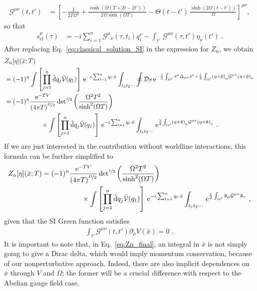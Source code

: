 \documentclass[12pt,a4paper]{article}
\numberwithin{equation}{section}
\numberwithin{equation}{section}
\begin{document}
\begin{align}
\mathcal{G}^{\mu\nu} (t,t')
&= \left[-\frac{1}{2T\Omega^2}+ \frac{\cosh{(\Omega(T+2t-2t'))}}{2\Omega\sinh{(\Omega T)}}- \Theta(t-t') \, \frac{\sinh{(2\Omega(t-t'))}}{\Omega} \right]^{\mu\nu}\!\! ,
\end{align}
so that
\begin{align}
s^\mu_{\mathrm{cl}}(\tau)&=-i \sum_{i=1}^n \mathcal{G}^{\mu}{}_{\nu}(\tau,t_i) q^\nu_{i} -\int_{t'} \, \mathcal{G}^{\mu\nu}(\tau,t')\eta_\nu(t')\label{eq:classical_solution_SI}\ .
\end{align}
After replacing Eq.~\eqref{eq:classical_solution_SI} in the expression for $Z_n$, we obtain 
\begin{align}
&Z_n[\eta](\bar{x};T) \nonumber
\\
&=(-1)^n\int \left[\prod_{j=1}^n \hat{\rm d}q_j \tilde{\mathcal{V}}(q_1) \right]\, \mathrm{e}^{-i \sum_{l=1}^n q_l \cdot \bar{x}} 
\int_{t_1t_2\cdots} \oint \mathcal{D}s \, \mathrm{e}^{-\frac12 \int_{t t'} \hat{s}^\mu \Delta_{\mu\nu} \hat{s}^\nu
+\frac12 \int_{t t'} \left( \eta +\mathfrak{d}\right)_\mu \mathcal{G}^{\mu\nu} \left( \eta +\mathfrak{d}\right)_\nu} \, \nonumber
\\
&=(-1)^n\frac{\mathrm{e}^{-TV}}{\left( 4\pi T \right)^{\nicefrac{D}{2}}} \, \mathrm{det}^{\nicefrac{1}{2}}\left( \frac{\Omega^2T^2}{\sinh^2(\Omega T)} \right) \nonumber
\\
&\hspace{2cm}\times
 \int \left[\prod_{j=1}^n \hat{\rm d}q_j \tilde{\mathcal{V}}(q_1) \right]\, \mathrm{e}^{-i \sum_{l=1}^n q_l \cdot \bar{x}} 
\int_{t_1t_2\cdots}\, \mathrm{e}^{\frac12 \int_{t t'} \left( \eta +\mathfrak{d}\right)_\mu \mathcal{G}^{\mu\nu} \left( \eta +\mathfrak{d}\right)_\nu} \ .
\end{align}
If we are just interested in the contribution without worldline interactions, this formula can be further simplified to
\begin{align}\label{eq:Zn_final}
\begin{split}
Z_n[\eta](\bar{x};T)
&=(-1)^n\frac{\mathrm{e}^{-TV}}{\left( 4\pi T \right)^{\nicefrac{D}{2}}} \, \mathrm{det}^{\nicefrac{1}{2}}\left( \frac{\Omega^2T^2}{\sinh^2(\Omega T)} \right)
\\
&\hspace{2cm}\times\int \left[\prod_{j=1}^n \hat{\rm d}q_j \tilde{\mathcal{V}}(q_1) \right]\, \mathrm{e}^{-i \sum_{l=1}^n q_l \cdot \bar{x}} 
\int_{t_1t_2\cdots}\, \mathrm{e}^{\frac12 \int_{t t'} \mathfrak{d}_\mu \mathcal{G}^{\mu\nu} \mathfrak{d}_\nu} \ ,
\end{split}
\end{align}
given that the SI Green function satisfies
\begin{align}
 \int_{t'} \mathcal{G}^{\mu\nu}(t,t') \partial_\mu V(\bar{x})=0\,\ .
\end{align}
It is important to note that, in Eq.~\eqref{eq:Zn_final}, an integral in $\bar{x}$ is not simply going to give a Dirac delta, which would imply momentum conservation, because of our nonperturbative approach. Indeed, there are also implicit dependences on $\bar{x}$ through $V$ and $\Omega$; the former will be a crucial difference with respect to the Abelian gauge field case.
\end{document}
